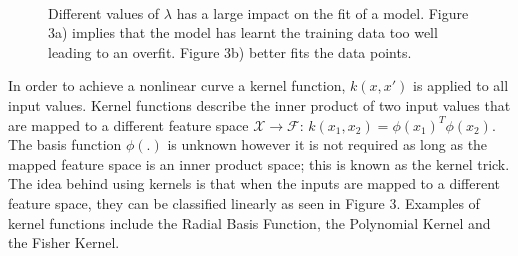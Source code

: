 \documentclass[a4paper,11pt,twoside]{article}
\begin{document}
\begin{figure} [h!]
\\
\caption{Different values of $\lambda$ has a large impact on the fit of a model. Figure 3a) implies that the model has learnt the training data too well leading to an overfit. Figure 3b) better fits the data points.}
\end{figure}


In order to achieve a nonlinear curve a kernel function, $k(x,x')$ is applied to all input values. Kernel functions describe the inner product of two input values that are mapped to a different feature space $\mathcal{X} \rightarrow \mathcal{F}$: $k(x_{1},x_{2}) = \phi(x_{1})^T\phi(x_{2})$. The basis function $\phi(.)$ is unknown however it is not required as long as the mapped feature space is an inner product space; this is known as the kernel trick. The idea behind using kernels is that when the inputs are mapped to a different feature space, they can be classified linearly as seen in Figure 3. Examples of kernel functions include the Radial Basis Function, the Polynomial Kernel and the  Fisher Kernel.
\end{document}

